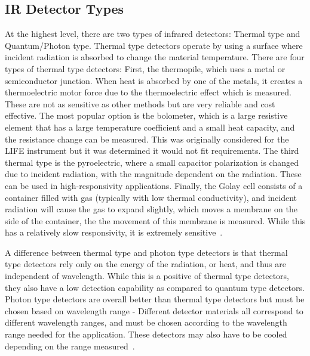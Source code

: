 \subsection{IR Detector Types}\label{IR_detector_types}
At the highest level, there are two types of infrared detectors: Thermal type and Quantum/Photon type. Thermal type detectors operate by using a surface where incident radiation is absorbed to change the material temperature. There are four types of thermal type detectors: First, the thermopile, which uses a metal or semiconductor junction. When heat is absorbed by one of the metals, it creates a thermoelectric motor force due to the thermoelectric effect which is measured. These are not as sensitive as other methods but are very reliable and cost effective. The most popular option is the bolometer, which is a large resistive element that has a large temperature coefficient and a small heat capacity, and the resistance change can be measured. This was originally considered for the LIFE instrument but it was determined it would not fit requirements. The third thermal type is the pyroelectric, where a small capacitor polarization is changed due to incident radiation, with the magnitude dependent on the radiation. These can be used in high-responsivity applications. Finally, the Golay cell consists of a container filled with gas (typically with low thermal conductivity), and incident radiation will cause the gas to expand slightly, which moves a membrane on the side of the container, the the movement of this membrane is measured. While this has a relatively slow responsivity, it is extremely sensitive~\citep{IR_detector_textbook}.

A difference between thermal type and photon type detectors is that thermal type detectors rely only on the energy of the radiation, or heat, and thus are independent of wavelength. While this is a positive of thermal type detectors, they also have a low detection capability as compared to quantum type detectors. Photon type detectors are overall better than thermal type detectors but must be chosen based on wavelength range - Different detector materials all correspond to different wavelength ranges, and must be chosen according to the wavelength range needed for the application. These detectors may also have to be cooled depending on the range measured~\citep{hamamatsu_ir_detectors}.

